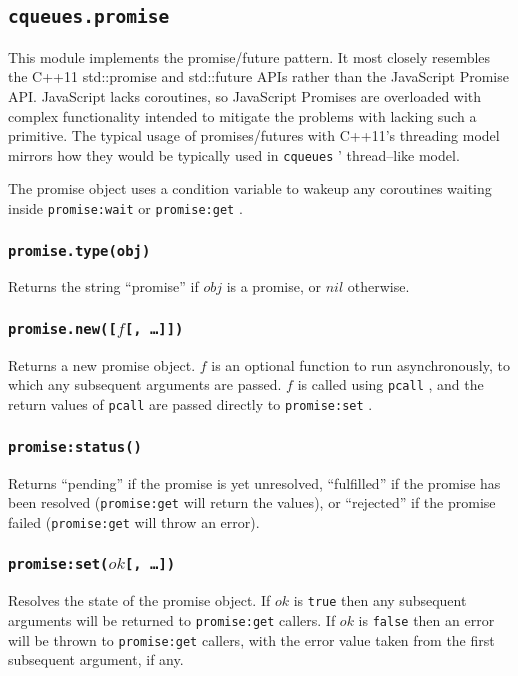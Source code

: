 \documentclass[11pt, oneside]{memoir}
\newcommand{\cqueues}[0]{\texttt{cqueues} }
\newcommand{\fn}[1]{\texttt{#1} }
\newcommand{\true}[0]{\texttt{true} }
\newcommand{\false}[0]{\texttt{false} }
\newcounter{toccols}
\newenvironment{Module}[1]{
	\subsection{\texttt{#1}}
	\addtocontents{toc}{
		\protect\begin{multicols}{\value{toccols}}
	}
}{
	\addtocontents{toc}{\protect\end{multicols}}
}
\begin{document}
\begin{Module}{cqueues.promise}

This module implements the promise/future pattern. It most closely resembles the C++11 std::promise and std::future APIs rather than the JavaScript Promise API. JavaScript lacks coroutines, so JavaScript Promises are overloaded with complex functionality intended to mitigate the problems with lacking such a primitive. The typical usage of promises/futures with C++11's threading model mirrors how they would be typically used in \cqueues' thread--like model.

The promise object uses a condition variable to wakeup any coroutines waiting inside \fn{promise:wait} or \fn{promise:get}.

\subsubsection[\fn{promise.type}]{\fn{promise.type(obj)}}

Returns the string ``promise'' if $obj$ is a promise, or $nil$ otherwise.

\subsubsection[\fn{promise.new}]{\fn{promise.new([$f$[, …]])}}

Returns a new promise object. $f$ is an optional function to run asynchronously, to which any subsequent arguments are passed. $f$ is called using \fn{pcall}, and the return values of \fn{pcall} are passed directly to \fn{promise:set}.

\subsubsection[\fn{promise:status}]{\fn{promise:status()}}

Returns ``pending'' if the promise is yet unresolved, ``fulfilled'' if the promise has been resolved (\fn{promise:get} will return the values), or ``rejected'' if the promise failed (\fn{promise:get} will throw an error).

\subsubsection[\fn{promise:set}]{\fn{promise:set($ok$[, …])}}

Resolves the state of the promise object. If $ok$ is \true then any subsequent arguments will be returned to \fn{promise:get} callers. If $ok$ is \false then an error will be thrown to \fn{promise:get} callers, with the error value taken from the first subsequent argument, if any.


\end{Module}
\end{document}
